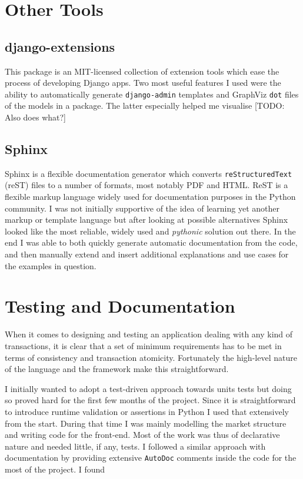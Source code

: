 \documentclass[bsc,frontabs,twoside,singlespacing,parskip,deptreport]{infthesis}     %
\begin{document}
\section{Other Tools}

\subsection{django-extensions}
    This package is an MIT-licensed collection of extension tools which ease the process of developing Django apps. Two most useful features I used were the ability to automatically generate {\tt django-admin} templates and GraphViz {\tt dot} files of the models in a package. The latter especially helped me visualise [TODO: Also does what?]

\subsection{Sphinx}
    Sphinx is a flexible documentation generator which converts {\tt reStructuredText} (reST) files to a number of formats, most notably PDF and HTML. ReST is a flexible markup language widely used for documentation purposes in the Python community. I was not initially supportive of the idea of learning yet another markup or template language but after looking at possible alternatives Sphinx looked like the most reliable, widely used and {\em pythonic} solution out there. In the end I was able to both quickly generate automatic documentation from the code, and then manually extend and insert additional explanations and use cases for the examples in question. 

\section{Testing and Documentation}
	When it comes to designing and testing an application dealing with any kind of transactions, it is clear that a set of minimum requirements has to be met in terms of consistency and transaction atomicity. Fortunately the high-level nature of the language and the framework make this straightforward. 

	I initially wanted to adopt a test-driven approach towards units tests but doing so proved hard for the first few months of the project. Since it is straightforward to introduce runtime validation or assertions in Python I used that extensively from the start. During that time I was mainly modelling the market structure and writing code for the front-end. Most of the work was thus of declarative nature and needed little, if any, tests. 
	I followed a similar approach with documentation by providing extensive {\tt AutoDoc} comments inside the code for the most of the project. I found   
\end{document}
